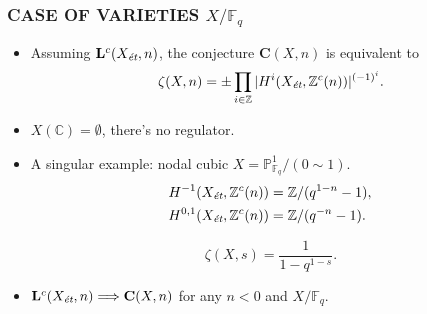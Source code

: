 \documentclass[handout]{beamer}
\newcommand{\CC}{\mathbb{C}}
\newcommand{\FF}{\mathbb{F}}
\newcommand{\PP}{\mathbb{P}}
\newcommand{\ZZ}{\mathbb{Z}}
\newcommand{\et}{\text{\it ét}}
\begin{document}

\begin{frame}
  \frametitle{CASE OF VARIETIES $X/\FF_q$}

  \begin{itemize}
  \item<2-> Assuming $\mathbf{L}^c (X_\et, n)$, the conjecture
    $\mathbf{C} (X,n)$ is equivalent to
    \[ \zeta (X,n) = \pm \prod_{i \in \ZZ} |H^i (X_\et, \ZZ^c (n))|^{(-1)^i}. \]

  \item<3-> $X (\CC) = \emptyset$, there's no regulator.

  \item<4-> A singular example: nodal cubic
    $X = \PP^1_{\FF_q} / (0\sim 1)$.
    \begin{align*}
      H^{-1} (X_\et, \ZZ^c (n)) & = \ZZ/(q^{1-n} - 1), \\
      H^{0,1} (X_\et, \ZZ^c (n)) & = \ZZ/(q^{-n} - 1).
    \end{align*}

    \[ \zeta (X,s) = \frac{1}{1 - q^{1-s}}. \]

  \item<5-> $\mathbf{L}^c (X_\et, n) \Longrightarrow \mathbf{C} (X,n)$
    for any $n < 0$ and $X/\FF_q$.
  \end{itemize}
\end{frame}

\end{document}
